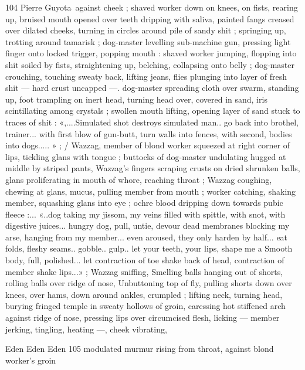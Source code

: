 104 Pierre Guyota\
against cheek ; shaved worker down on knees, on fists, rearing up,
bruised mouth opened over teeth dripping with saliva, painted fangs
creased over dilated cheeks, turning in circles around pile of sandy
shit ; springing up, trotting around tamarisk ; dog-master levelling
sub-machine gun, pressing light finger onto locked trigger, popping
mouth : shaved worker jumping, flopping into shit soiled by fists,
straightening up, belching, collapsing onto belly ; dog-master
crouching, touching sweaty back, lifting jeans, flies plunging into
layer of fresh shit — hard crust uncapped —. dog-master spreading
cloth over swarm, standing up, foot trampling on inert head, turning
head over, covered in sand, iris scintillating among crystals ; swollen
mouth lifting, opening layer of sand stuck to traces of shit :
«,....Simulated shot destroys simulated man.. go back into brothel,
trainer... with first blow of gun-butt, turn walls into fences, with
second, bodies into dogs..... » ; / Wazzag, member of blond worker
squeezed at right corner of lips, tickling glans with tongue ; buttocks
of dog-master undulating hugged at middle by striped pants,
Wazzag's fingers scraping crusts on dried shrunken balls, glans
proliferating in mouth of whore, reaching throat ; Wazzag coughing,
chewing at glans, mucus, pulling member from mouth ; worker
catching, shaking member, squashing glans into eye ; ochre blood
dripping down towards pubic fleece :... «..dog taking my jissom, my
veins filled with spittle, with snot, with digestive juices... hungry dog,
pull, untie, devour dead membranes blocking my arse, hanging from
my member... even aroused, they only harden by half... eat folds,
fleshy seams.. gobble.. gulp.. let your teeth, your lips, shape me a
Smooth body, full, polished... let contraction of toe shake back of
head, contraction of member shake lips...» ; Wazzag sniffing,
Smelling balls hanging out of shorts, rolling balls over ridge of nose,
Unbuttoning top of fly, pulling shorts down over knees, over hams,
down around ankles, crumpled ; lifting neck, turning head, burying
fringed temple in sweaty hollows of groin, caressing hot stiffened
arch against ridge of nose, pressing lips over circumcised flesh,
licking — member jerking, tingling, heating —, cheek vibrating,

Eden Eden Eden 105
modulated murmur rising from throat, against blond worker's groin


